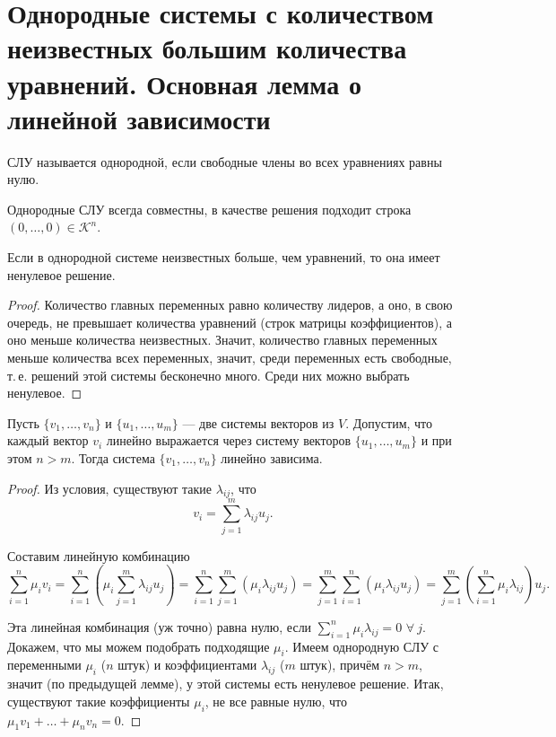 \section{Однородные системы с количеством неизвестных большим количества уравнений. Основная лемма о линейной зависимости}

\begin{definition}
    СЛУ называется однородной, если свободные члены во всех уравнениях равны нулю.
\end{definition}

\begin{orangebox}
    Однородные СЛУ всегда совместны, в качестве решения подходит строка $(0, \ldots, 0) \in \mathcal{K}^n$.
\end{orangebox}

\begin{lemma}
    Если в однородной системе неизвестных больше, чем уравнений, то она имеет ненулевое решение.
\end{lemma}

\begin{proof}
    Количество главных переменных равно количеству лидеров, а оно, в свою очередь, не превышает количества уравнений (строк матрицы коэффициентов), а оно меньше количества неизвестных. Значит, количество главных переменных меньше количества всех переменных, значит, среди переменных есть свободные, т.\,е. решений этой системы бесконечно много. Среди них можно выбрать ненулевое.
\end{proof}

\begin{lemma}
    Пусть $\{v_1, \ldots, v_n\}$ и $\{u_1, \ldots, u_m\}$ --- две системы векторов из $V$. Допустим, что каждый вектор $v_i$ линейно выражается через систему векторов $\{u_1, \ldots, u_m\}$ и при этом $n > m$. Тогда система $\{v_1, \ldots, v_n\}$ линейно зависима.
\end{lemma}

\begin{proof}
    Из условия, существуют такие $\lambda_{ij}$, что
    $$
    v_i = \sum_{j = 1}^m\lambda_{ij}u_j.
    $$


    Составим линейную комбинацию
    $$
    \sum_{i = 1}^n\mu_iv_i = \sum_{i = 1}^n\left(\mu_i\sum_{j = 1}^m\lambda_{ij}u_j\right) = \sum_{i = 1}^n\sum_{j = 1}^m(\mu_i\lambda_{ij}u_j) = \sum_{j = 1}^m\sum_{i = 1}^n(\mu_i\lambda_{ij}u_j) = \sum_{j = 1}^m\left(\sum_{i = 1}^n\mu_i\lambda_{ij}\right)u_j.
    $$

    Эта линейная комбинация (уж точно) равна нулю, если $\displaystyle \sum_{i = 1}^n\mu_i\lambda_{ij} = 0$ $\forall\!\:j$. Докажем, что мы можем подобрать подходящие $\mu_i$. Имеем однородную СЛУ с переменными $\mu_i$ ($n$ штук) и коэффициентами $\lambda_{ij}$ ($m$ штук), причём $n > m$, значит (по предыдущей лемме), у этой системы есть ненулевое решение. Итак, существуют такие коэффициенты $\mu_i$, не все равные нулю, что $\mu_1v_1 + \ldots + \mu_nv_n = 0$.
\end{proof}

